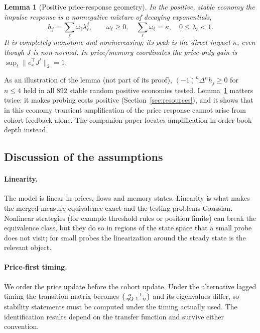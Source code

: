 \documentclass[12pt]{article}
\newtheorem{lemma}[theorem]{Lemma}
\theoremstyle{definition}
\theoremstyle{remark}
\begin{document}
\begin{lemma}[Positive price-response geometry]\label{lem:cm}
In the positive, stable economy the impulse response is a nonnegative mixture of decaying exponentials,
\[
h_j=\sum_\ell \omega_\ell\lambda_\ell^j,\qquad \omega_\ell\ge0,\quad \sum_\ell\omega_\ell=\kappa,\quad 0\le\lambda_\ell<1 .
\]
It is completely monotone and nonincreasing; its peak is the direct impact $\kappa$, even though $J$ is non-normal. In price/memory coordinates the price-only gain is $\sup_t\|e_x^\top J^t\|_2=1$.
\end{lemma}

As an illustration of the lemma (not part of its proof), $(-1)^n\Delta^nh_j\ge0$ for $n\le4$ held in all 892 stable random positive economies tested. Lemma~\ref{lem:cm} matters twice: it makes probing costs positive (Section~\ref{sec:resources}), and it shows that in this economy transient amplification of the price response cannot arise from cohort feedback alone. The companion paper locates amplification in order-book depth instead.

\subsection{Discussion of the assumptions}\label{sec:assumptions}

\paragraph{Linearity.} The model is linear in prices, flows and memory states. Linearity is what makes the merged-measure equivalence exact and the testing problems Gaussian. Nonlinear strategies (for example threshold rules or position limits) can break the equivalence class, but they do so in regions of the state space that a small probe does not visit; for small probes the linearization around the steady state is the relevant object.

\paragraph{Price-first timing.} We order the price update before the cohort update. Under the alternative lagged timing the transition matrix becomes $\begin{psmallmatrix}a&1\\ \eta Q&1-\eta\end{psmallmatrix}$ and its eigenvalues differ, so stability statements must be computed under the timing actually used. The identification results depend on the transfer function and survive either convention.
\end{document}
